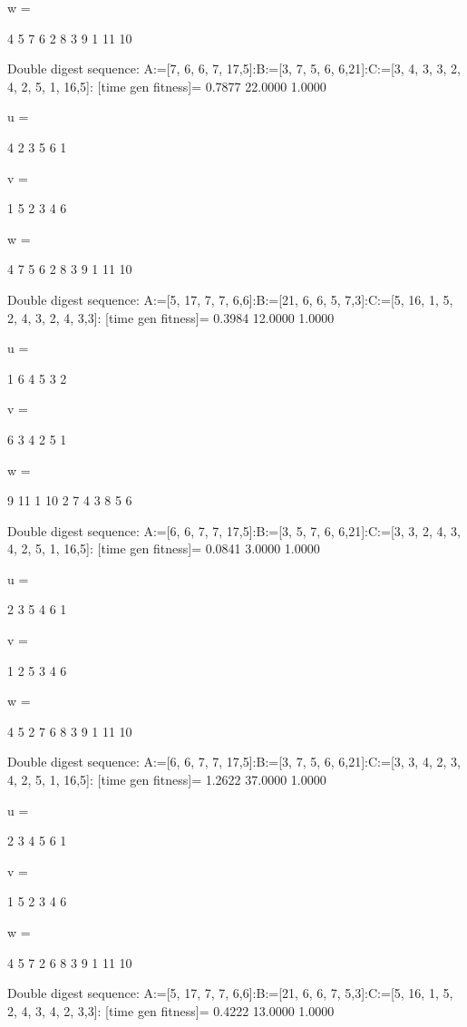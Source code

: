 w =

     4     5     7     6     2     8     3     9     1    11    10

Double digest sequence:
A:=[7, 6, 6, 7, 17,5]:B:=[3, 7, 5, 6, 6,21]:C:=[3, 4, 3, 3, 2, 4, 2, 5, 1, 16,5]:
[time gen fitness]=
    0.7877   22.0000    1.0000


u =

     4     2     3     5     6     1


v =

     1     5     2     3     4     6


w =

     4     7     5     6     2     8     3     9     1    11    10

Double digest sequence:
A:=[5, 17, 7, 7, 6,6]:B:=[21, 6, 6, 5, 7,3]:C:=[5, 16, 1, 5, 2, 4, 3, 2, 4, 3,3]:
[time gen fitness]=
    0.3984   12.0000    1.0000


u =

     1     6     4     5     3     2


v =

     6     3     4     2     5     1


w =

     9    11     1    10     2     7     4     3     8     5     6

Double digest sequence:
A:=[6, 6, 7, 7, 17,5]:B:=[3, 5, 7, 6, 6,21]:C:=[3, 3, 2, 4, 3, 4, 2, 5, 1, 16,5]:
[time gen fitness]=
    0.0841    3.0000    1.0000


u =

     2     3     5     4     6     1


v =

     1     2     5     3     4     6


w =

     4     5     2     7     6     8     3     9     1    11    10

Double digest sequence:
A:=[6, 6, 7, 7, 17,5]:B:=[3, 7, 5, 6, 6,21]:C:=[3, 3, 4, 2, 3, 4, 2, 5, 1, 16,5]:
[time gen fitness]=
    1.2622   37.0000    1.0000


u =

     2     3     4     5     6     1


v =

     1     5     2     3     4     6


w =

     4     5     7     2     6     8     3     9     1    11    10

Double digest sequence:
A:=[5, 17, 7, 7, 6,6]:B:=[21, 6, 6, 7, 5,3]:C:=[5, 16, 1, 5, 2, 4, 3, 4, 2, 3,3]:
[time gen fitness]=
    0.4222   13.0000    1.0000



